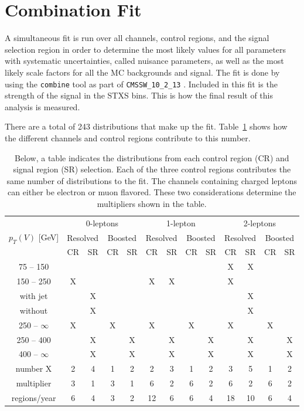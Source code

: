 \section{Combination Fit}

A simultaneous fit is run over all channels, control regions, and the signal selection region
in order to determine the most likely values for all
parameters with systematic uncertainties, called nuisance parameters,
as well as the most likely scale factors for all the MC backgrounds and signal.
The fit is done by using the \texttt{combine} tool \cite{cmsdocumentation} as part of
\texttt{CMSSW\_10\_2\_13} \cite{cmssw_doxygen}.
Included in this fit is the strength of the signal in the STXS bins.
This is how the final result of this analysis is measured.

There are a total of 243 distributions that make up the fit.
Table~\ref{tab:num-hists} shows how the different channels and control regions contribute to this number.
%
\begin{table}
  \caption[Counts of distributions for each selection]{
    Below, a table indicates the distributions from each control region (CR) and signal region (SR) selection.
    Each of the three control regions contributes the same number of distributions to the fit.
    The channels containing charged leptons can either be electron or muon flavored.
    These two considerations determine the multipliers shown in the table.
  }
  \begin{tabular}{|c|c|c|c|c|c|c|c|c|c|c|c|c|}
    \hline
    \multirow{3}{*}{$p_T(V)$ [GeV]} & \multicolumn{4}{c|}{0-leptons} & \multicolumn{4}{c|}{1-lepton} & \multicolumn{4}{c|}{2-leptons} \\
    & \multicolumn{2}{c|}{Resolved} & \multicolumn{2}{c|}{Boosted} & \multicolumn{2}{c|}{Resolved} & \multicolumn{2}{c|}{Boosted} & \multicolumn{2}{c|}{Resolved} & \multicolumn{2}{c|}{Boosted} \\
    & CR & SR & CR & SR & CR & SR & CR & SR & CR & SR & CR & SR \\
    \hline
    75 -- 150     &   &   &   &   &   &   &   &   & X & X &   &   \\
    \hline
    150 -- 250    & X &   &   &   & X & X &   &   & X &   &   &   \\
    with jet      &   & X &   &   &   &   &   &   &   & X &   &   \\
    without       &   & X &   &   &   &   &   &   &   & X &   &   \\
    \hline
    250 -- $\infty$ & X &   & X &   & X &   & X &   & X &   & X &   \\
    250 -- 400      &   & X &   & X &   & X &   & X &   & X &   & X \\
    400 -- $\infty$ &   & X &   & X &   & X &   & X &   & X &   & X \\
    \hline
    number X      & 2 & 4 & 1 & 2 & 2 & 3 & 1 & 2 & 3 & 5 & 1 & 2 \\
    multiplier    & 3 & 1 & 3 & 1 & 6 & 2 & 6 & 2 & 6 & 2 & 6 & 2 \\
    regions/year  & 6 & 4 & 3 & 2 & 12 & 6 & 6 & 4 & 18 & 10 & 6 & 4 \\
   \hline
  \end{tabular}
  \label{tab:num-hists}
\end{table}
